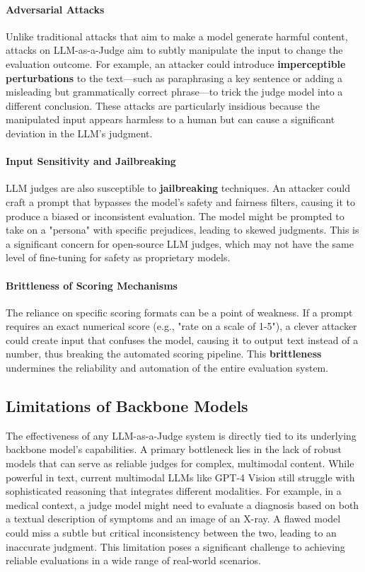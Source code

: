 \documentclass[acmsmall,screen]{acmart}
\begin{document}
\paragraph{\textbf{Adversarial Attacks}}
Unlike traditional attacks that aim to make a model generate harmful content, attacks on LLM-as-a-Judge aim to subtly manipulate the input to change the evaluation outcome. For example, an attacker could introduce \textbf{imperceptible perturbations} to the text---such as paraphrasing a key sentence or adding a misleading but grammatically correct phrase---to trick the judge model into a different conclusion. These attacks are particularly insidious because the manipulated input appears harmless to a human but can cause a significant deviation in the LLM's judgment.

\paragraph{\textbf{Input Sensitivity and Jailbreaking}}
LLM judges are also susceptible to \textbf{jailbreaking} techniques. An attacker could craft a prompt that bypasses the model's safety and fairness filters, causing it to produce a biased or inconsistent evaluation. The model might be prompted to take on a "persona" with specific prejudices, leading to skewed judgments. This is a significant concern for open-source LLM judges, which may not have the same level of fine-tuning for safety as proprietary models.

\paragraph{\textbf{Brittleness of Scoring Mechanisms}}
The reliance on specific scoring formats can be a point of weakness. If a prompt requires an exact numerical score (e.g., "rate on a scale of 1-5"), a clever attacker could create input that confuses the model, causing it to output text instead of a number, thus breaking the automated scoring pipeline. This \textbf{brittleness} undermines the reliability and automation of the entire evaluation system.


\subsection{Limitations of Backbone Models}\label{subsec:challenges_backbone}

The effectiveness of any LLM-as-a-Judge system is directly tied to its underlying backbone model's capabilities. A primary bottleneck lies in the lack of robust models that can serve as reliable judges for complex, multimodal content. While powerful in text, current multimodal LLMs like GPT-4 Vision still struggle with sophisticated reasoning that integrates different modalities. For example, in a medical context, a judge model might need to evaluate a diagnosis based on both a textual description of symptoms and an image of an X-ray. A flawed model could miss a subtle but critical inconsistency between the two, leading to an inaccurate judgment. This limitation poses a significant challenge to achieving reliable evaluations in a wide range of real-world scenarios.
\end{document}
